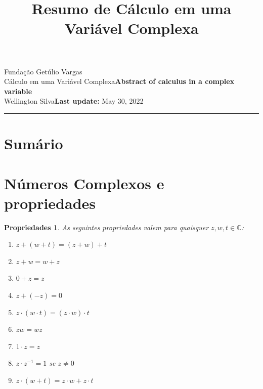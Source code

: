 \documentclass{article}
\title{Resumo de Cálculo em uma Variável Complexa}
\author{}
\date{}
\newtheorem{prop}{Propriedades}
\newcommand{\assignment}{Abstract of calculus in a complex variable}
\newcommand{\duedate}{May 30, 2022}
\begin{document}
Fundação Getúlio Vargas\hfill\\
Cálculo em uma Variável Complexa\hfill\textbf{\assignment}\\
Wellington Silva\hfill\textbf{Last update:} \duedate\\
\smallskip\hrule\bigskip

{\let\newpage\relax\maketitle}

\section*{Sumário}

\textbf{}
\vspace{4.0mm}

\textbf{}
\vspace{4.0mm}

\textbf{}
\vspace{4.0mm}

\textbf{}
\vspace{4.0mm}

\textbf{}
\vspace{4.0mm}

\textbf{}
\vspace{4.0mm}

\textbf{}
\vspace{4.0mm}

\textbf{}
\vspace{4.0mm}

\textbf{}
\vspace{4.0mm}

\textbf{}
\vspace{4.0mm}

\newpage

\section*{Números Complexos e propriedades}
\label{s1}

\begin{prop} As seguintes propriedades valem para quaisquer $z, w, t \in \mathbb{C}$:

\begin{enumerate}[label=(\alph*)]
    \item $z + (w + t) = (z + w) + t$
    \item $z + w = w + z$
    \item $0 + z = z$
    \item $z + (-z) = 0$
    \item $z \cdot (w \cdot t) = (z \cdot w) \cdot t$
    \item $zw = wz$
    \item $1 \cdot z = z$
    \item $z \cdot z^{-1} = 1$ se $z \neq 0$
    \item $z \cdot (w + t) = z \cdot w + z \cdot t$
\end{enumerate}
\end{prop}
\end{document}
